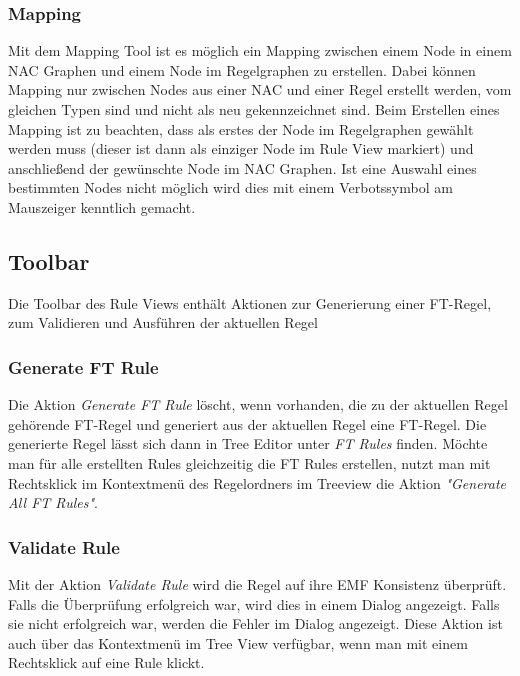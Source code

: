 \subsubsection{Mapping}
\label{subsubsec:Rule_View-Mapping}
Mit dem Mapping Tool ist es möglich ein Mapping zwischen einem Node in einem NAC Graphen und einem Node im Regelgraphen zu erstellen. Dabei können Mapping nur zwischen Nodes aus einer NAC und einer Regel erstellt werden, vom gleichen Typen sind und nicht als neu gekennzeichnet sind. Beim Erstellen eines Mapping ist zu beachten, dass als erstes der Node im Regelgraphen gewählt werden muss (dieser ist dann als einziger Node im Rule View markiert) und anschließend der gewünschte Node im NAC Graphen. Ist eine Auswahl eines bestimmten Nodes nicht möglich wird dies mit einem Verbotssymbol am Mauszeiger kenntlich gemacht.

\subsection{Toolbar}
Die Toolbar des Rule Views enthält Aktionen zur Generierung einer FT-Regel, zum Validieren und Ausführen der aktuellen Regel

\subsubsection{Generate FT Rule}
Die Aktion \emph{Generate FT Rule} löscht, wenn vorhanden, die zu der aktuellen Regel gehörende FT-Regel und generiert aus der aktuellen Regel eine FT-Regel. Die generierte Regel lässt sich dann in Tree Editor unter \emph{FT Rules} finden.
Möchte man für alle erstellten Rules gleichzeitig die FT Rules erstellen, nutzt man mit Rechtsklick im Kontextmenü des Regelordners im Treeview die Aktion \emph{"Generate All FT Rules"}.

\subsubsection{Validate Rule}
Mit der Aktion \emph{Validate Rule} wird die Regel auf ihre EMF Konsistenz überprüft. Falls die Überprüfung erfolgreich war, wird dies in einem Dialog angezeigt. Falls sie nicht erfolgreich war, werden die Fehler im Dialog angezeigt. Diese Aktion ist auch über das Kontextmenü im Tree View verfügbar, wenn man mit einem Rechtsklick auf eine Rule klickt.

